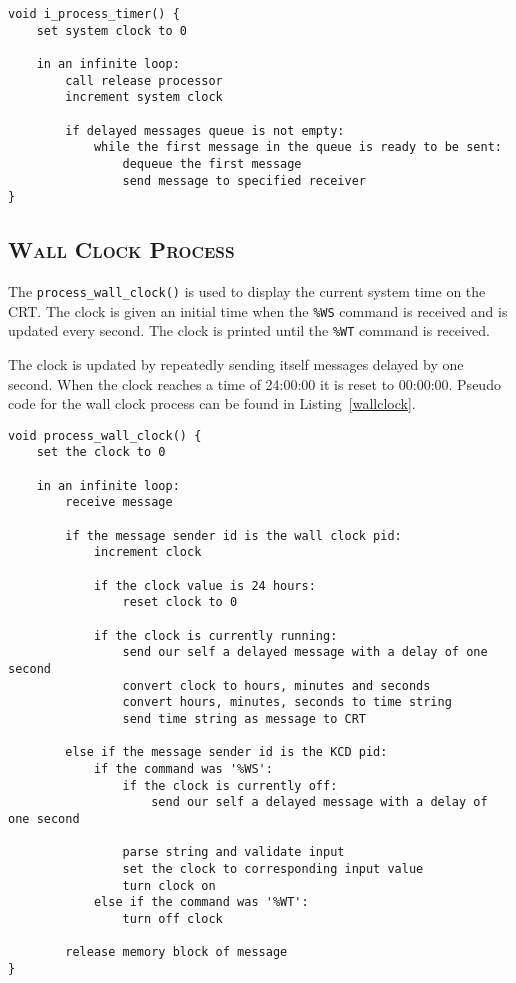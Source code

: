 \documentclass[oneside]{report}
\begin{document}
\begin{lstlisting}
void i_process_timer() {
    set system clock to 0

    in an infinite loop:
        call release processor
        increment system clock

        if delayed messages queue is not empty:
            while the first message in the queue is ready to be sent:
                dequeue the first message
                send message to specified receiver        
}
\end{lstlisting}

\subsection{\textsc{Wall Clock Process}}
The \texttt{process\_wall\_clock()} is used to display the current
system time on the CRT. The clock is given an initial time when the
\texttt{\%WS} command is received and is updated every second. The
clock is printed until the \texttt{\%WT} command is received.

The clock is updated by repeatedly sending itself messages delayed by
one second. When the clock reaches a time of 24:00:00 it is reset to
00:00:00. Pseudo code for the wall clock process can be found in
Listing~\ref{wallclock}.

\begin{lstlisting}
void process_wall_clock() {
    set the clock to 0

    in an infinite loop:
        receive message

        if the message sender id is the wall clock pid:
            increment clock

            if the clock value is 24 hours:
                reset clock to 0

            if the clock is currently running:
                send our self a delayed message with a delay of one second
                convert clock to hours, minutes and seconds
                convert hours, minutes, seconds to time string
                send time string as message to CRT

        else if the message sender id is the KCD pid:
            if the command was '%WS':
                if the clock is currently off:
                    send our self a delayed message with a delay of one second

                parse string and validate input
                set the clock to corresponding input value
                turn clock on
            else if the command was '%WT':
                turn off clock

        release memory block of message
}
\end{lstlisting}
\end{document}
